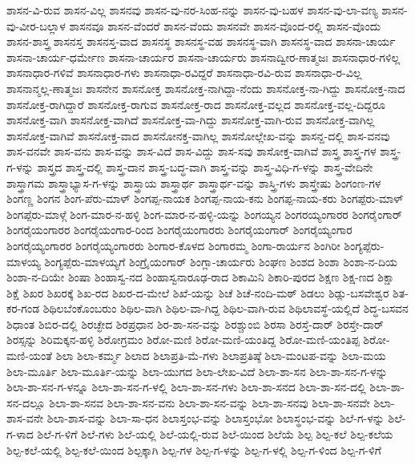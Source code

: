 ಶಾಸನ-ವಿ-ರುವ
ಶಾಸನ-ವಿಲ್ಲ
ಶಾಸನವು
ಶಾಸನ-ವು-ನರ-ಸಿಂಹ-ನನ್ನು
ಶಾಸನ-ವು-ಬಹಳ
ಶಾಸನ-ವು-ಲಾ-ವಣ್ಯ
ಶಾಸನ-ವು-ವೀರ-ಬಲ್ಲಾಳ
ಶಾಸನವೂ
ಶಾಸನ-ವೆಂದರೆ
ಶಾಸನ-ವೆಂದು
ಶಾಸನವೇ
ಶಾಸನ-ವೊಂದ-ರಲ್ಲಿ
ಶಾಸನ-ವೊಂದು
ಶಾಸನ-ಶಾಸ್ತ್ರ
ಶಾಸನಸ್ತ
ಶಾಸನಸ್ತ-ವಾದ
ಶಾಸನಸ್ಥ
ಶಾಸನಸ್ಥ-ವಹ
ಶಾಸನಸ್ಥ-ವಾಗಿ
ಶಾಸನಸ್ಥ-ವಾದ
ಶಾಸನಾ-ಚಾರ್ಯ
ಶಾಸನಾ-ಚಾರ್ಯ-ಧರ್ಮೇಣ
ಶಾಸನಾ-ಚಾರ್ಯರ
ಶಾಸನಾ-ಚಾರ್ಯರು
ಶಾಸನಾದ್ವೀರ-ಣಾತ್ಮಜಃ
ಶಾಸನಾಧಾರ-ಗಳಿಲ್ಲ
ಶಾಸನಾಧಾರ-ಗಳಿವೆ
ಶಾಸನಾಧಾರ-ಗಳು
ಶಾಸನಾಧಾ-ರವಿದ್ದರೆ
ಶಾಸನಾಧಾ-ರವಿ-ರುವ
ಶಾಸನಾಧಾ-ರ-ವಿಲ್ಲ
ಶಾಸನಾನ್ಮಲ್ಲ-ಣಾತ್ಮಜಃ
ಶಾಸನೇನ
ಶಾಸನೋಕ್ತ
ಶಾಸನೋಕ್ತ-ನಾಗಿದ್ದಾ-ನೆಂದು
ಶಾಸನೋಕ್ತ-ನಾ-ಗಿದ್ದು
ಶಾಸನೋಕ್ತ-ನಾದ
ಶಾಸನೋಕ್ತ-ರಾಗಿದ್ದಾರೆ
ಶಾಸನೋಕ್ತ-ರಾಗುವ
ಶಾಸನೋಕ್ತ-ರಾದ
ಶಾಸನೋಕ್ತ-ವಲ್ಲದ
ಶಾಸನೋಕ್ತ-ವಲ್ಲ-ದಿದ್ದರೂ
ಶಾಸನೋಕ್ತ-ವಾಗಿ
ಶಾಸನೋಕ್ತ-ವಾಗಿದೆ
ಶಾಸನೋಕ್ತ-ವಾ-ಗಿದ್ದು
ಶಾಸನೋಕ್ತ-ವಾಗಿ-ರುವ
ಶಾಸನೋಕ್ತ-ವಾಗಿಲ್ಲ
ಶಾಸನೋಕ್ತ-ವಾಗಿವೆ
ಶಾಸನೋಕ್ತ-ವಾದ
ಶಾಸನೋನಕ್ತ-ವಾಗಿಲ್ಲ
ಶಾಸನೋಲ್ಲೇಖ-ವನ್ನು
ಶಾಸನ್ದ-ದಲ್ಲಿ
ಶಾಸ-ವನವು
ಶಾಸ-ವನವೇ
ಶಾಸ-ವನು
ಶಾಸ-ವನ್ನು
ಶಾಸ-ವಿದೆ
ಶಾಸ-ವಿದ್ದು
ಶಾಸ-ಸವು
ಶಾಸೋಕ್ತ-ವಾಗಿವೆ
ಶಾಸ್ತ್ರ
ಶಾಸ್ತ್ರ-ಗಳ
ಶಾಸ್ತ್ರ-ಗ-ಳನ್ನು
ಶಾಸ್ತ್ರದ
ಶಾಸ್ತ್ರ-ದಲ್ಲಿ
ಶಾಸ್ತ್ರ-ದಾನ
ಶಾಸ್ತ್ರ-ಬದ್ಧ-ವಾಗಿ
ಶಾಸ್ತ್ರ-ವನ್ನು
ಶಾಸ್ತ್ರ-ವಿಧಿ-ಗ-ಳನ್ನು
ಶಾಸ್ತ್ರ-ವೇದಿನೇ
ಶಾಸ್ತ್ರಾಗಮ
ಶಾಸ್ತ್ರಾಭ್ಯಾಸ-ಗ-ಳನ್ನು
ಶಾಸ್ತ್ರಾಯ
ಶಾಸ್ತ್ರಾರ್ಥ
ಶಾಸ್ತ್ರಾರ್ಥ-ವನ್ನು
ಶಾಸ್ತ್ರಿ-ಗಳು
ಶಾಸ್ತ್ರೇಷು
ಶಿಂಗಂಣ-ಗಳ
ಶಿಂಗಣ್ಣ
ಶಿಂಗನ
ಶಿಂಗ-ಪೆರು-ಮಾಳ್
ಶಿಂಗಪ್ಪ-ನಾಯಕ
ಶಿಂಗಪ್ಪ-ನಾಯ-ಕನು
ಶಿಂಗಪ್ಪ-ನಾಯ-ಕರು
ಶಿಂಗಪ್ಪೆರು-ಮಾಳ್
ಶಿಂಗಪ್ಪೆರು-ಮಾಳ್ಗೆ
ಶಿಂಗ-ಮಾರ-ನ-ಹಳ್ಳಿ
ಶಿಂಗ-ಮಾರ-ನ-ಹಳ್ಳಿ-ಯನ್ನು
ಶಿಂಗಯ್ಯನ
ಶಿಂಗರಯ್ಯಂಗಾರರ
ಶಿಂಗರೈಂಗಾರ್
ಶಿಂಗರೈಯಂಗಾರರ
ಶಿಂಗರೈಯಂಗಾರ-ರಿಂದ
ಶಿಂಗರೈಯಂಗಾರರು
ಶಿಂಗರೈಯಂಗಾರ್
ಶಿಂಗರೈಯ್ಯಂಗಾರ
ಶಿಂಗರೈಯ್ಯಂಗಾರರ
ಶಿಂಗರೈಯ್ಯಂಗಾರರು
ಶಿಂಗಾರ-ಕೊಳದ
ಶಿಂಗಾರಮ್ಮ
ಶಿಂಗಾ-ರಾರ್ಯನ
ಶಿಂಗಿರೀ
ಶಿಂಗ್ಯಪ್ಪೆರು-ಮಾಳಯ್ಯ
ಶಿಂಗ್ಯಪ್ಪೆರು-ಮಾಳಯ್ಯಗೆ
ಶಿಂಗ್ರೈಯಂಗಾರ್
ಶಿಂಗ್ಲಾ-ಚಾರ್ಯರು
ಶಿಂಘಣ
ಶಿಂಶದ
ಶಿಂಶಾ
ಶಿಂಶಾ-ನ-ದಿಯ
ಶಿಂಶಾ-ನ-ದಿಯೇ
ಶಿಂಷಾ
ಶಿಂಹಾಸ್ವ-ನದ
ಶಿಂಹಾಸ್ವನಾರೂಢ-ರಾದ
ಶಿಕಾಮಿನಿ
ಶಿಕಾರಿ-ಪುರದ
ಶಿಕ್ಷಣ
ಶಿಕ್ಷ-ಣದ
ಶಿಕ್ಷಾ
ಶಿಕ್ಷೆ
ಶಿಖರ
ಶಿಖರಕ್ಕೆ
ಶಿಖ-ರದ
ಶಿಖರ-ದ-ಮೇಲೆ
ಶಿಖೆ-ಯನ್ನು
ಶಿಚೆ
ಶಿಚೆ-ನಂದಿ-ಮಠ್
ಶಿಡಲು
ಶಿಡ್ಲು-ಬಸವೇಶ್ವರ
ಶಿತ-ಕರ-ಗಂಡ
ಶಿಥಿಲಬೆಂಕೊಂಬರುಂ
ಶಿಥಿಲ-ವಾಗಿ
ಶಿಥಿಲ-ವಾ-ಗಿದ್ದ
ಶಿಥಿಲ-ವಾಗಿ-ರುವ
ಶಿಥಿಲಾವಸ್ಥೆ-ಯಲ್ಲಿದೆ
ಶಿದ್ಧ-ಬಸವನ
ಶಿಧಾಂತ
ಶಿಬಿರ-ದಲ್ಲಿ
ಶಿರಚ್ಛೇದ
ಶಿರಪ್ರಧಾನ
ಶಿರ-ಶಾ-ಸನ-ವನ್ನು
ಶಿರಶ್ಚುಂಬಿ
ಶಿರಸಾ
ಶಿರಸ್ತೆ-ದಾರ್
ಶಿರಸ್ತೇ-ದಾರ್
ಶಿರಸ್ಸನ್ನು
ಶಿರಿಮಕ್ಕನ-ಹಳ್ಳಿ
ಶಿರೋಗ್ರಮಂ
ಶಿರೋ-ಮಣಿ
ಶಿರೋ-ಮಣಿ-ಯಂತಿದ್ದ
ಶಿರೋ-ಮಣಿ-ಯಂತಿಪ್ಪ
ಶಿರೋ-ಮಣಿ-ಯಂತೆ
ಶಿಲಾ
ಶಿಲಾ-ಕರ್ಮ್ಮ
ಶಿಲಾದ
ಶಿಲಾಪ್ರತಿ-ಮೆ-ಗಳು
ಶಿಲಾಪ್ರತಿಷ್ಠೆ
ಶಿಲಾ-ಮಂಟಪ-ವನ್ನು
ಶಿಲಾ-ಮಯ
ಶಿಲಾ-ಮೂರ್ತಿ
ಶಿಲಾ-ಮೂರ್ತಿ-ಯನ್ನು
ಶಿಲಾ-ಯುಗದ
ಶಿಲಾ-ಲೇಖ-ವಿದೆ
ಶಿಲಾ-ಶಾ-ಸನ
ಶಿಲಾ-ಶಾ-ಸನ-ಗ-ಳನ್ನು
ಶಿಲಾ-ಶಾ-ಸನ-ಗ-ಳನ್ನೂ
ಶಿಲಾ-ಶಾ-ಸನ-ಗ-ಳಲ್ಲಿ
ಶಿಲಾ-ಶಾ-ಸನ-ಗಳು
ಶಿಲಾ-ಶಾ-ಸನದ
ಶಿಲಾ-ಶಾ-ಸನ-ದಲ್ಲಿ
ಶಿಲಾ-ಶಾ-ಸನ-ದಲ್ಲೂ
ಶಿಲಾ-ಶಾ-ಸನವ
ಶಿಲಾ-ಶಾ-ಸನ-ವನು
ಶಿಲಾ-ಶಾ-ಸನ-ವನ್ನು
ಶಿಲಾ-ಶಾ-ಸನವು
ಶಿಲಾ-ಶಾ-ಸನವೇ
ಶಿಲಾ-ಶಾಸ-ವನೇ
ಶಿಲಾ-ಶಾಸ-ವನ್ನು
ಶಿಲಾ-ಸಾ-ಧನ
ಶಿಲಾಸ್ತಂಭ-ವನ್ನು
ಶಿಲಾಸ್ತಂಭೋ
ಶಿಲಾಸ್ಥಂಭ-ವನ್ನು
ಶಿಲೆ-ಗ-ಳನ್ನು
ಶಿಲೆ-ಗ-ಳಾದ
ಶಿಲೆ-ಗ-ಳಿಗೆ
ಶಿಲೆ-ಗಳು
ಶಿಲೆ-ಯಲ್ಲಿ
ಶಿಲೆ-ಯಲ್ಲಿ-ರುವ
ಶಿಲೆ-ಯಿಂದ
ಶಿಲೆಯೆ
ಶಿಲ್ಪ
ಶಿಲ್ಪ-ಕಲೆ
ಶಿಲ್ಪ-ಕಲೆಯ
ಶಿಲ್ಪ-ಕಲೆ-ಯಲ್ಲಿ
ಶಿಲ್ಪ-ಕಲೆ-ಯಿಂದ
ಶಿಲ್ಪಕ್ಕಾಗಿ
ಶಿಲ್ಪ-ಗಳ
ಶಿಲ್ಪ-ಗ-ಳನ್ನು
ಶಿಲ್ಪ-ಗ-ಳಲ್ಲಿ
ಶಿಲ್ಪ-ಗ-ಳಿಂದ
ಶಿಲ್ಪ-ಗ-ಳಿಗೆ
